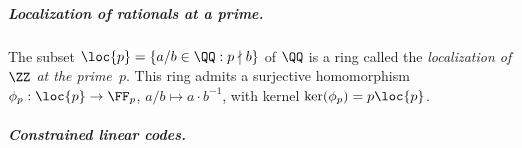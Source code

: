 
\subparagraph{Localization of rationals at a prime.}
\label{sec:zinc-crypto-local-rings}
The subset $\loc{p} = \{a/b\in \QQ : p\nmid b\}$ of $\QQ$ is a ring called the \emph{localization of $\ZZ$ at the prime~$p$}. This ring admits a surjective homomorphism $\phi_p: \loc{p} \to \FF_p$, $a/b \mapsto a \cdot b^{-1}$, with kernel $\ker(\phi_p) = p\loc{p}$.

















\subparagraph{Constrained linear codes.}

